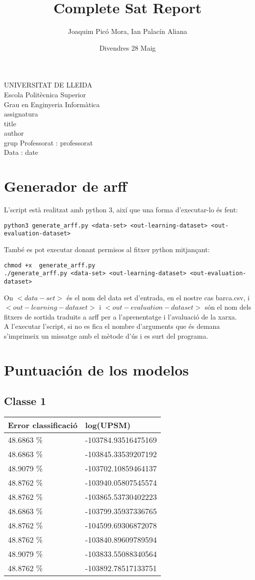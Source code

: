\documentclass{article}
\title{Complete Sat Report}
\author{Joaquim Picó Mora, Ian Palacín Aliana}
\date{Divendres 28 Maig}
\renewcommand{\maketitle}{ %
	\begin{titlepage}
		\raggedright{UNIVERSITAT DE LLEIDA \\
			Escola Politècnica Superior \\
			Grau en Enginyeria Informàtica\\
			\1assignatura\\}
		\vspace{5cm}
		\centering\huge{\5title \\}
		\vspace{3cm}
		\large{\6author} \\
		\normalsize{\3grup}
		\vfill
		Professorat : \4professorat \\
		Data : \7date
\end{titlepage}}
\begin{document}
	\maketitle
	\thispagestyle{empty}


\section{Generador de arff}	
L'script està realitzat amb python 3, així que una forma d'executar-lo és fent:
\begin{verbatim}
python3 generate_arff.py <data-set> <out-learning-dataset> <out-evaluation-dataset>
\end{verbatim}
També es pot executar donant permisos al fitxer python mitjançant:
\begin{verbatim}
chmod +x  generate_arff.py
./generate_arff.py <data-set> <out-learning-dataset> <out-evaluation-dataset>
\end{verbatim}
On $<data-set>$ és el nom del data set d'entrada, en el nostre cas barca.csv, i $<out-learning-dataset>$ i $<out-evaluation-dataset>$ són el nom dels fitxers de sortida traduits a arff per a l'aprenentatge i l'avaluació de la xarxa.\\
A l'executar l'script, si no es fica el nombre d'arguments que és demana s'imprimeix un missatge amb el mètode d'ús i es surt del programa. 
\section{Puntuación de los modelos}
\subsection{Classe 1}
\begin{table}[H]
\begin{tabular}{ll}
\hline
Error classificació & log(UPSM)           \\
\hline
48.6863 \%          & -103784.93516475169 \\
48.6863 \%          & -103845.33539207192 \\
48.9079 \%          & -103702.10859464137 \\
48.8762 \%          & -103940.05807545574 \\
48.8762 \%          & -103865.53730402223 \\
48.6863 \%          & -103799.35937336765 \\
48.8762 \%          & -104599.69306872078 \\
48.8762 \%          & -103840.89609789594 \\
48.9079 \%          & -103833.55088340564 \\
48.8762 \%          & -103892.78517133751
\end{tabular}
\end{table}
\end{document}
